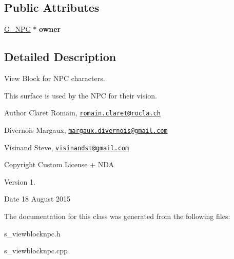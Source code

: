 \subsection*{Public Attributes}
\begin{DoxyCompactItemize}
\item 
\hypertarget{class_s___view_block_n_p_c_ac708a8c5d42dab068c4053fdd369a550}{}\hyperlink{class_g___n_p_c}{G\+\_\+\+N\+P\+C} $\ast$ {\bfseries owner}\label{class_s___view_block_n_p_c_ac708a8c5d42dab068c4053fdd369a550}

\end{DoxyCompactItemize}


\subsection{Detailed Description}
View Block for N\+P\+C characters. 

This surface is used by the N\+P\+C for their vision. \begin{DoxyAuthor}{Author}
Claret Romain, \href{mailto:romain.claret@rocla.ch}{\tt romain.\+claret@rocla.\+ch} 

Divernois Margaux, \href{mailto:margaux.divernois@gmail.com}{\tt margaux.\+divernois@gmail.\+com} 

Visinand Steve, \href{mailto:visinandst@gmail.com}{\tt visinandst@gmail.\+com} 
\end{DoxyAuthor}
\begin{DoxyCopyright}{Copyright}
Custom License + N\+D\+A 
\end{DoxyCopyright}
\begin{DoxyVersion}{Version}
1. 
\end{DoxyVersion}
\begin{DoxyDate}{Date}
18 August 2015 
\end{DoxyDate}


The documentation for this class was generated from the following files\+:\begin{DoxyCompactItemize}
\item 
s\+\_\+viewblocknpc.\+h\item 
s\+\_\+viewblocknpc.\+cpp\end{DoxyCompactItemize}

